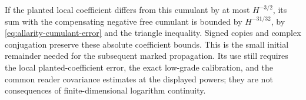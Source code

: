 If the planted local coefficient differs from this cumulant by at most
$H^{-3/2}$, its sum with the compensating negative free cumulant is
bounded by $H^{-31/32}$, by \eqref{eq:allarity-cumulant-error} and the
triangle inequality. Signed copies and complex conjugation preserve
these absolute coefficient bounds. This is the small initial remainder
needed for the subsequent marked propagation. Its use still requires
the local planted-coefficient error, the exact low-grade calibration,
and the common reader covariance estimates at the displayed powers;
they are not consequences of finite-dimensional logarithm continuity.
